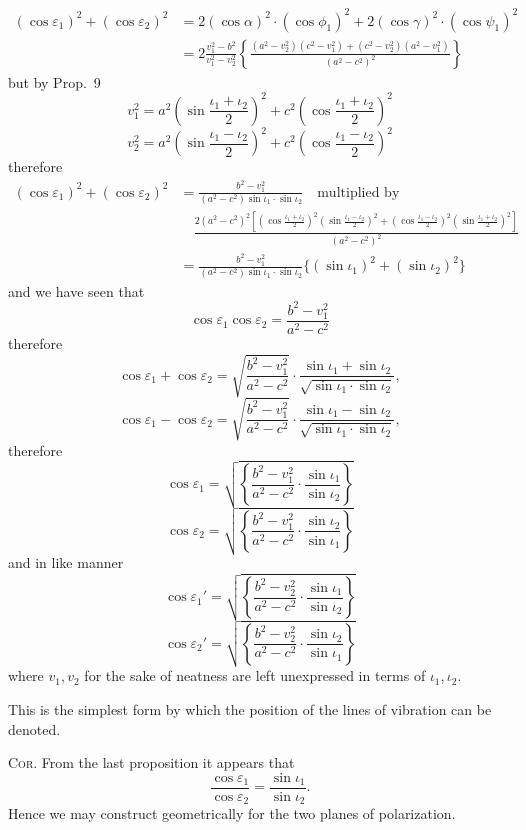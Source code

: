 \documentclass[11pt]{article}
\newcommand{\sourcepage}[1]{\marginpar{\scriptsize p.~#1}}
\begin{document}
\begin{align*}
(\cos\varepsilon_1)^2+(\cos\varepsilon_2)^2
&=2(\cos\alpha)^2\cdot(\cos\phi_1)^2+2(\cos\gamma)^2\cdot(\cos\psi_1)^2\\
&=2\frac{v_1^2-b^2}{v_1^2-v_2^2}\left\{
\frac{(a^2-v_2^2)(c^2-v_1^2)+(c^2-v_2^2)(a^2-v_1^2)}{(a^2-c^2)^2}\right\}
\end{align*}
but by Prop.~9
\[
 v_1^2=a^2\left(\sin\frac{\iota_1+\iota_2}{2}\right)^2+c^2\left(\cos\frac{\iota_1+\iota_2}{2}\right)^2
\]
\[
 v_2^2=a^2\left(\sin\frac{\iota_1-\iota_2}{2}\right)^2+c^2\left(\cos\frac{\iota_1-\iota_2}{2}\right)^2
\]
therefore
\begin{align*}
(\cos\varepsilon_1)^2+(\cos\varepsilon_2)^2
&=\frac{b^2-v_1^2}{(a^2-c^2)\sin\iota_1\cdot\sin\iota_2}\quad \text{multiplied by}\\
&\quad \frac{2(a^2-c^2)^2\left[\left(\cos\frac{\iota_1+\iota_2}{2}\right)^2\left(\sin\frac{\iota_1-\iota_2}{2}\right)^2
+\left(\cos\frac{\iota_1-\iota_2}{2}\right)^2\left(\sin\frac{\iota_1+\iota_2}{2}\right)^2\right]}{(a^2-c^2)^2}\\
&=\frac{b^2-v_1^2}{(a^2-c^2)\sin\iota_1\cdot\sin\iota_2}\{(\sin\iota_1)^2+(\sin\iota_2)^2\}
\end{align*}
and we have seen that
\[
 \cos\varepsilon_1\cos\varepsilon_2=\frac{b^2-v_1^2}{a^2-c^2}
\]
therefore
\[
 \cos\varepsilon_1+\cos\varepsilon_2
=\sqrt{\frac{b^2-v_1^2}{a^2-c^2}}\cdot\frac{\sin\iota_1+\sin\iota_2}{\sqrt{\sin\iota_1\cdot\sin\iota_2}},
\]
\[
 \cos\varepsilon_1-\cos\varepsilon_2
=\sqrt{\frac{b^2-v_1^2}{a^2-c^2}}\cdot\frac{\sin\iota_1-\sin\iota_2}{\sqrt{\sin\iota_1\cdot\sin\iota_2}},
\]
therefore
\[
 \cos\varepsilon_1=\sqrt{\left\{\frac{b^2-v_1^2}{a^2-c^2}\cdot\frac{\sin\iota_1}{\sin\iota_2}\right\}}
\]
\[
 \cos\varepsilon_2=\sqrt{\left\{\frac{b^2-v_1^2}{a^2-c^2}\cdot\frac{\sin\iota_2}{\sin\iota_1}\right\}}
\]
and in like manner
\[
 \cos\varepsilon_1'=\sqrt{\left\{\frac{b^2-v_2^2}{a^2-c^2}\cdot\frac{\sin\iota_1}{\sin\iota_2}\right\}}
\]
\[
 \cos\varepsilon_2'=\sqrt{\left\{\frac{b^2-v_2^2}{a^2-c^2}\cdot\frac{\sin\iota_2}{\sin\iota_1}\right\}}
\]
where $v_1,v_2$ for the sake of neatness are left unexpressed in terms of $\iota_1,\iota_2$.

\sourcepage{13}
This is the simplest form by which the position of the lines of vibration can be denoted.

\textsc{Cor.} From the last proposition it appears that
\[
 \frac{\cos\varepsilon_1}{\cos\varepsilon_2}=\frac{\sin\iota_1}{\sin\iota_2}.
\]
Hence we may construct geometrically for the two planes of polarization.
\end{document}
